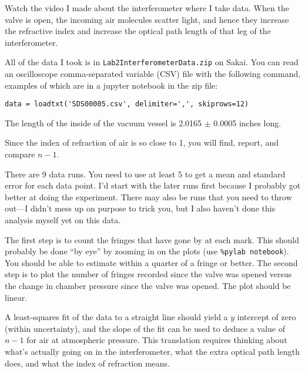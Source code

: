 \documentclass[11pt]{hmcpset}
\begin{document}

	\pagebreak

\begin{problem}
	Watch the video I made about the interferometer where I take data. 	
	When the valve is open, the incoming air molecules scatter light, and hence they increase the refractive index and increase the optical path length of that leg of the interferometer.
	
	 All of the data I took is in \texttt{Lab2InterferometerData.zip} on Sakai. You can read an oscilloscope comma-separated variable (CSV) file with the following command, examples of which are in a jupyter notebook in the zip file:
\begin{lstlisting}[style=Python]
data = loadtxt('SDS00005.csv', delimiter=',', skiprows=12)
\end{lstlisting}
	The length of the inside of the vacuum vessel is 2.0165 $\pm$ 0.0005 inches long.

	Since the index of refraction of air is so close to 1, you will find, report, and compare $n-1$.

	There are 9 data runs. You need to use at least 5 to get a mean and standard error for each data point. I'd start with the later runs first because I probably got better at doing the experiment. There may also be runs that you need to throw out---I didn't mess up on purpose to trick you, but I also haven't done this analysis myself yet on this data.
	
	The first step is to count the fringes that have gone by at each mark. This should probably be done ``by eye'' by zooming in on the plots (use \texttt{\%pylab notebook}). You should be able to estimate within a quarter of a fringe or better. The second step is to plot the number of fringes recorded since the valve was opened versus the change in chamber pressure since the valve was opened. The plot should be linear.
	
	A least-squares fit of the data to a straight line should yield a $y$ intercept of zero (within uncertainty), and the slope of the fit can be used to deduce a value of $n-1$ for air at atmospheric pressure. This translation requires thinking about what's actually going on in the interferometer, what the extra optical path length does, and what the index of refraction means.
	

\end{problem}
\end{document}
